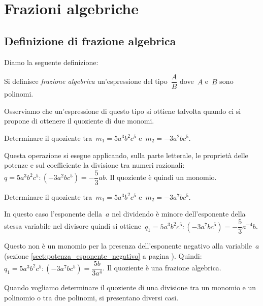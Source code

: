 
\chapter{Frazioni algebriche}

\section{Definizione di frazione algebrica}

Diamo la seguente definizione:
\begin{definizione}
Si definisce \emph{frazione algebrica} un'espressione del tipo~$\dfrac{A}{B}$ dove~$A$ e~$B$ sono polinomi.
\end{definizione}
Osserviamo che un’espressione di questo tipo si ottiene talvolta quando ci si propone di ottenere il quoziente di due monomi.

\begin{exrig}
 \begin{esempio}
Determinare il quoziente tra~$m_{1}=5a^{3}b^{2}c^{5}$ e~$m_{2}=-3a^{2}bc^{5}$.

Questa operazione si esegue applicando, sulla parte letterale, le proprietà delle potenze e sul coefficiente la divisione tra numeri
razionali:~$q=5a^{3}b^{2}c^{5}:\left(-3a^{2}bc^{5}\right)=-{\dfrac{5}{3}}ab$.
Il quoziente è quindi un monomio.
 \end{esempio}

 \begin{esempio}
Determinare il quoziente tra~$m_{1}=5a^{3}b^{2}c^{5}$ e~$m_{2}=-3a^{7}bc^{5}$.

In questo caso l’esponente della~$a$ nel dividendo è minore dell’esponente della stessa variabile nel divisore quindi
si ottiene~$q_{1}=5a^{3}b^{2}c^{5}:\left(-3a^{7}bc^{5}\right)=-{\dfrac{5}{3}}a^{-4}b$. 

Questo non è un monomio per la presenza dell’esponente
negativo alla variabile~$a$ (sezione \ref{sect:potenza_esponente_negativo} a pagina \pageref{sect:potenza_esponente_negativo}).
Quindi:~$q_{1}=5a^{3}b^{2}c^{5}:\left(-3a^{7}bc^{5}\right)={\dfrac{5b}{3a^{4}}}$. Il quoziente è una frazione algebrica.
 \end{esempio}
\end{exrig}

Quando vogliamo determinare il quoziente di una divisione tra un monomio e un polinomio o tra due polinomi, si presentano diversi casi.

